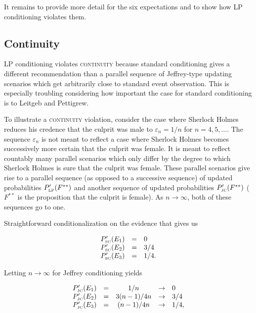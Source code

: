\documentclass[11pt]{article}
\begin{document}
It remains to provide more detail for the six expectations and to
show how LP conditioning violates them. 

\subsection{Continuity}
\label{Continuity}

LP conditioning violates \textsc{continuity} because standard
conditioning gives a different recommendation than a parallel sequence
of Jeffrey-type updating scenarios which get arbitrarily close to
standard event observation. This is especially troubling considering
how important the case for standard conditioning is to Leitgeb and
Pettigrew.

To illustrate a \textsc{continuity} violation, consider the case where
Sherlock Holmes reduces his credence that the culprit was male to
$\varepsilon_{n}=1/n$ for $n=4,5,\ldots$. The sequence
$\varepsilon_{n}$ is not meant to reflect a case where Sherlock Holmes
becomes successively more certain that the culprit was female. It is
meant to reflect countably many parallel scenarios which only differ
by the degree to which Sherlock Holmes is sure that the culprit was
female. These parallel scenarios give rise to a parallel sequence (as
opposed to a successive sequence) of updated probabilities
$P'_{\mbox{\tiny LP}}(F^{**})$ and another sequence of updated
probabilities $P'_{\mbox{\tiny JC}}(F^{**})$ ($F^{**}$ is the
proposition that the culprit is female). As $n\rightarrow\infty$, both
of these sequences go to one.

Straightforward conditionalization on the evidence that  gives us 

\begin{equation}
  \label{eq:sherlockcontsc}
  \begin{array}{rcl}
  P'_{\mbox{\tiny SC}}(E_{1})&=&0\\
  P'_{\mbox{\tiny SC}}(E_{2})&=&3/4\\
  P'_{\mbox{\tiny SC}}(E_{3})&=&1/4.
\end{array}
\end{equation}

Letting $n\rightarrow\infty$ for Jeffrey conditioning yields

\begin{equation}
  \label{eq:sherlockcontjc}
  \begin{array}{rcccl}
  P'_{\mbox{\tiny JC}}(E_{1})&=&1/n&\rightarrow&0\\
  P'_{\mbox{\tiny JC}}(E_{2})&=&3(n-1)/4n&\rightarrow&3/4\\
  P'_{\mbox{\tiny JC}}(E_{3})&=&(n-1)/4n&\rightarrow&1/4,
\end{array}
\end{equation}
\end{document}

